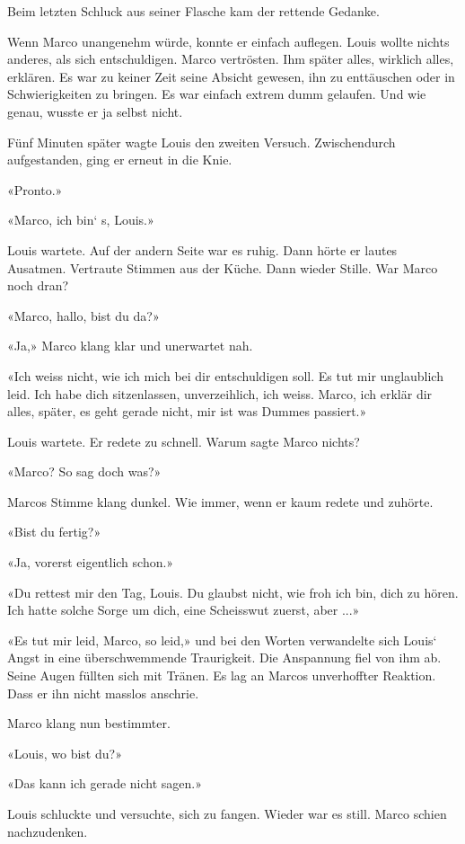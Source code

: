Beim letzten Schluck aus seiner Flasche kam der rettende Gedanke.

Wenn Marco unangenehm würde, konnte er einfach auflegen. Louis wollte
nichts anderes, als sich entschuldigen. Marco vertrösten. Ihm später
alles, wirklich alles, erklären. Es war zu keiner Zeit seine Absicht
gewesen, ihn zu enttäuschen oder in Schwierigkeiten zu bringen. Es war
einfach extrem dumm gelaufen. Und wie genau, wusste er ja selbst nicht.

Fünf Minuten später wagte Louis den zweiten Versuch. Zwischendurch
aufgestanden, ging er erneut in die Knie.

«Pronto.»

«Marco, ich bin` s, Louis.»

Louis wartete. Auf der andern Seite war es ruhig. Dann hörte er lautes
Ausatmen. Vertraute Stimmen aus der Küche. Dann wieder Stille. War Marco
noch dran?

«Marco, hallo, bist du da?»

«Ja,» Marco klang klar und unerwartet nah.

«Ich weiss nicht, wie ich mich bei dir entschuldigen soll. Es tut mir
unglaublich leid. Ich habe dich sitzenlassen, unverzeihlich, ich weiss.
Marco, ich erklär dir alles, später, es geht gerade nicht, mir ist was
Dummes passiert.»

Louis wartete. Er redete zu schnell. Warum sagte Marco nichts?

«Marco? So sag doch was?»

Marcos Stimme klang dunkel. Wie immer, wenn er kaum redete und zuhörte.

«Bist du fertig?»

«Ja, vorerst eigentlich schon.»

«Du rettest mir den Tag, Louis. Du glaubst nicht, wie froh ich bin, dich
zu hören. Ich hatte solche Sorge um dich, eine Scheisswut zuerst, aber
...»

«Es tut mir leid, Marco, so leid,» und bei den Worten verwandelte sich
Louis` Angst in eine überschwemmende Traurigkeit. Die Anspannung fiel
von ihm ab. Seine Augen füllten sich mit Tränen. Es lag an Marcos
unverhoffter Reaktion. Dass er ihn nicht masslos anschrie.

Marco klang nun bestimmter.

«Louis, wo bist du?»

«Das kann ich gerade nicht sagen.»

Louis schluckte und versuchte, sich zu fangen. Wieder war es still.
Marco schien nachzudenken.

